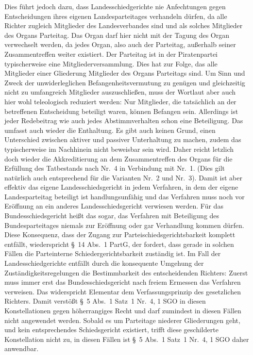 Dies führt jedoch dazu, dass Landesschiedgerichte nie Anfechtungen gegen Entscheidungen ihres eigenen Landesparteitages verhandeln dürfen, da alle Richter zugleich Mitglieder des Landesverbandes sind und als solches Mitglieder des Organs Parteitag.
Das Organ darf hier nicht mit der Tagung des Organ verwechselt werden, da jedes Organ, also auch der Parteitag, außerhalb seiner Zusammentreffen weiter existiert.
Der Parteitag ist in der Piratenpartei typischerweise eine Mitgliederversammlung.
Dies hat zur Folge, das alle Mitglieder einer Gliederung Mitglieder des Organs Parteitags sind.
Um Sinn und Zweck der unwiderleglichen Befangenheitsvermutung zu genügen und gleichzeitig nicht zu umfangreich Mitglieder auszuschließen, muss der Wortlaut aber auch hier wohl teleologisch reduziert werden: Nur Mitglieder, die tatsächlich an der betreffenen Entscheidung beteiligt waren, können Befangen sein.
Allerdings ist jeder Redebeitrag wie auch jedes Abstimmverhalten schon eine Beteiligung. Das umfasst auch wieder die Enthaltung.
Es gibt auch keinen Grund, einen Unterschied zwischen aktiver und passiver Unterhaltung zu machen, zudem das typischerweise im Nachhinein nicht beweisbar sein wird.
Daher reicht letzlich doch wieder die Akkreditierung an dem Zusammentreffen des Organs für die Erfüllung des Tatbestands nach Nr.~4 in Verbindung mit Nr.~1.
(Dies gilt natürlich auch entsprechend für die Varianten Nr.~2 und Nr.~3).
Damit ist aber effektiv das eigene Landesschiedsgericht in jedem Verfahren, in dem der eigene Landesparteitag beteiligt ist handlungsunfähig und das Verfahren muss noch vor Eröffnung an ein anderes Landesschiedsgericht verwiesen werden.
Für das Bundesschiedsgericht heißt das sogar, das Verfahren mit Beteiligung des Bundesparteitages niemals zur Eröffnung oder gar Verhandlung kommen dürfen.
Diese Konsequenz, dass der Zugang zur Parteischiedsgerichtsbarkeit komplett entfällt, wiederspricht \S~14 Abs.~1 PartG, der fordert, dass gerade in solchen Fällen die Parteinterne Schiedergerichtsbarkeit zuständig ist.
Im Fall der Landesschiedgerichte entfällt durch die konsequente Umgehung der Zuständigkeitsregelungen die Bestimmbarkeit des entscheidenden Richters: Zuerst muss immer erst das Bundesschiedsgericht nach freiem Ermessen das Verfahren verweisen.
Das widerspricht Elementar dem Verfassungsprinzip des gesetzlichen Richters.
Damit verstößt \S~5 Abs.~1 Satz~1 Nr.~4, 1 SGO in diesen Konstellationen gegen höherrangiges Recht und darf zumindest in diesen Fällen nicht angewendet werden.
Sobald es um Parteitage niederer Gliederungen geht, und kein entsprechendes Schiedsgericht existiert, trifft diese geschilderte Konstellation nicht zu, in diesen Fällen ist \S~5 Abs.~1 Satz~1 Nr.~4, 1 SGO daher anwendbar.


